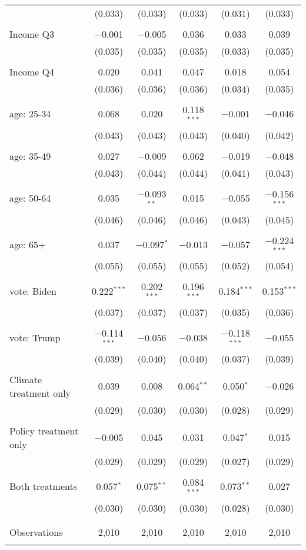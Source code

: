 \begin{tabular}{@{\extracolsep{5pt}}lccccc}
  & (0.033) & (0.033) & (0.033) & (0.031) & (0.033) \\ 
  & & & & & \\ 
 Income Q3 & $-$0.001 & $-$0.005 & 0.036 & 0.033 & 0.039 \\ 
  & (0.035) & (0.035) & (0.035) & (0.033) & (0.035) \\ 
  & & & & & \\ 
 Income Q4 & 0.020 & 0.041 & 0.047 & 0.018 & 0.054 \\ 
  & (0.036) & (0.036) & (0.036) & (0.034) & (0.035) \\ 
  & & & & & \\ 
 age: 25-34 & 0.068 & 0.020 & 0.118$^{***}$ & $-$0.001 & $-$0.046 \\ 
  & (0.043) & (0.043) & (0.043) & (0.040) & (0.042) \\ 
  & & & & & \\ 
 age: 35-49 & 0.027 & $-$0.009 & 0.062 & $-$0.019 & $-$0.048 \\ 
  & (0.043) & (0.044) & (0.044) & (0.041) & (0.043) \\ 
  & & & & & \\ 
 age: 50-64 & 0.035 & $-$0.093$^{**}$ & 0.015 & $-$0.055 & $-$0.156$^{***}$ \\ 
  & (0.046) & (0.046) & (0.046) & (0.043) & (0.045) \\ 
  & & & & & \\ 
 age: 65+ & 0.037 & $-$0.097$^{*}$ & $-$0.013 & $-$0.057 & $-$0.224$^{***}$ \\ 
  & (0.055) & (0.055) & (0.055) & (0.052) & (0.054) \\ 
  & & & & & \\ 
 vote: Biden & 0.222$^{***}$ & 0.202$^{***}$ & 0.196$^{***}$ & 0.184$^{***}$ & 0.153$^{***}$ \\ 
  & (0.037) & (0.037) & (0.037) & (0.035) & (0.036) \\ 
  & & & & & \\ 
 vote: Trump & $-$0.114$^{***}$ & $-$0.056 & $-$0.038 & $-$0.118$^{***}$ & $-$0.055 \\ 
  & (0.039) & (0.040) & (0.040) & (0.037) & (0.039) \\ 
  & & & & & \\ 
 Climate treatment only & 0.039 & 0.008 & 0.064$^{**}$ & 0.050$^{*}$ & $-$0.026 \\ 
  & (0.029) & (0.030) & (0.030) & (0.028) & (0.029) \\ 
  & & & & & \\ 
 Policy treatment only & $-$0.005 & 0.045 & 0.031 & 0.047$^{*}$ & 0.015 \\ 
  & (0.029) & (0.029) & (0.029) & (0.027) & (0.029) \\ 
  & & & & & \\ 
 Both treatments & 0.057$^{*}$ & 0.075$^{**}$ & 0.084$^{***}$ & 0.073$^{**}$ & 0.027 \\ 
  & (0.030) & (0.030) & (0.030) & (0.028) & (0.030) \\ 
  & & & & & \\ 
\hline \\[-1.8ex] 

Observations & 2,010 & 2,010 & 2,010 & 2,010 & 2,010 \\ 
\hline 
\hline \\[-1.8ex] 
\end{tabular} 